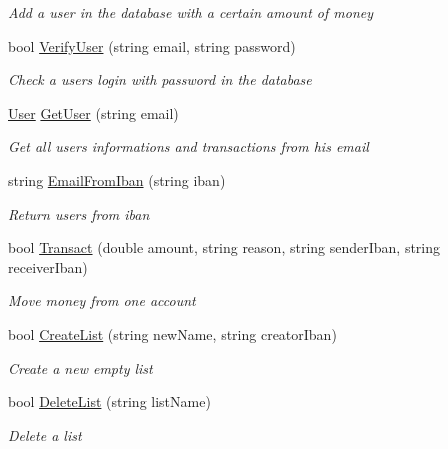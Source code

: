 \begin{DoxyCompactItemize}
\begin{DoxyCompactList}\small\item\em Add a user in the database with a certain amount of money \end{DoxyCompactList}\item 
bool \mbox{\hyperlink{class_projet_banque_1_1_database_management_a2b1815dc73339c7abbe63e2b8403143d}{Verify\+User}} (string email, string password)
\begin{DoxyCompactList}\small\item\em Check a user\textquotesingle{}s login with password in the database \end{DoxyCompactList}\item 
\mbox{\hyperlink{class_projet_banque_1_1_user}{User}} \mbox{\hyperlink{class_projet_banque_1_1_database_management_aa9be95f45987bd7f55d1553e43e1c546}{Get\+User}} (string email)
\begin{DoxyCompactList}\small\item\em Get all user\textquotesingle{}s informations and transactions from his email \end{DoxyCompactList}\item 
string \mbox{\hyperlink{class_projet_banque_1_1_database_management_a15437c7a1ca0d2319481df7c14d2f2e2}{Email\+From\+Iban}} (string iban)
\begin{DoxyCompactList}\small\item\em Return user\textquotesingle{}s from iban \end{DoxyCompactList}\item 
bool \mbox{\hyperlink{class_projet_banque_1_1_database_management_abc8ae003c490e8cd373a8e6cf1a2de6a}{Transact}} (double amount, string reason, string sender\+Iban, string receiver\+Iban)
\begin{DoxyCompactList}\small\item\em Move money from one account \end{DoxyCompactList}\item 
bool \mbox{\hyperlink{class_projet_banque_1_1_database_management_acb94b89091289ffd5ca8f24224e46c81}{Create\+List}} (string new\+Name, string creator\+Iban)
\begin{DoxyCompactList}\small\item\em Create a new empty list \end{DoxyCompactList}\item 
bool \mbox{\hyperlink{class_projet_banque_1_1_database_management_aaeebc8afb1a9c9e654d27ceb1719a740}{Delete\+List}} (string list\+Name)
\begin{DoxyCompactList}\small\item\em Delete a list \end{DoxyCompactList}\item 

\end{DoxyCompactItemize}
